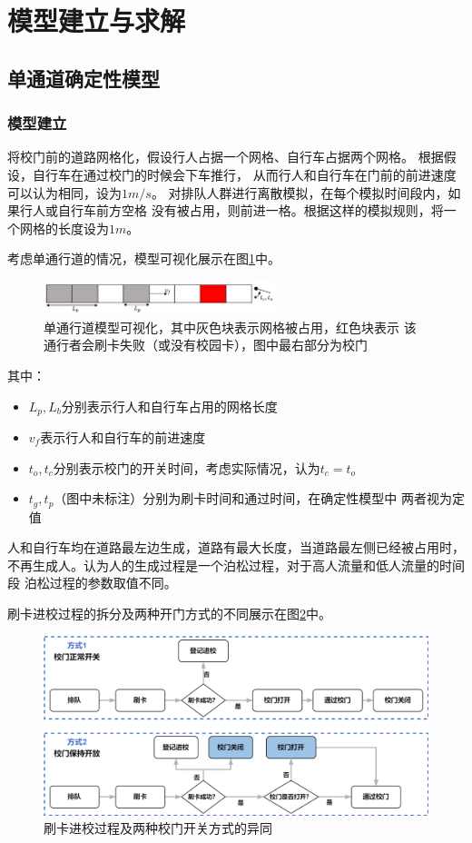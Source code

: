 \section{模型建立与求解}
\subsection{单通道确定性模型}
\subsubsection{模型建立}
\par 将校门前的道路网格化，假设行人占据一个网格、自行车占据两个网格。
根据假设，自行车在通过校门的时候会下车推行，
从而行人和自行车在门前的前进速度可以认为相同，设为$1m/s$。
对排队人群进行离散模拟，在每个模拟时间段内，如果行人或自行车前方空格
没有被占用，则前进一格。根据这样的模拟规则，将一个网格的长度设为$1m$。
\par 考虑单通行道的情况，模型可视化展示在图\ref{fig:1-lane-model}中。
\begin{figure}[ht]
    \centering
    \includegraphics[width=0.6\textwidth]{images/cellular_automata_1_lane.png}
    \caption{单通行道模型可视化，其中灰色块表示网格被占用，红色块表示
    该通行者会刷卡失败（或没有校园卡），图中最右部分为校门}
    \label{fig:1-lane-model}
\end{figure}
\newline 其中：
\begin{itemize}
    \item $L_p, L_b$分别表示行人和自行车占用的网格长度
    \item $v_f$表示行人和自行车的前进速度
    \item $t_o, t_c$分别表示校门的开关时间，考虑实际情况，认为$t_c=t_o$
    \item $t_g,t_p$（图中未标注）分别为刷卡时间和通过时间，在确定性模型中
    两者视为定值
\end{itemize}
人和自行车均在道路最左边生成，道路有最大长度，当道路最左侧已经被占用时，
不再生成人。认为人的生成过程是一个泊松过程，对于高人流量和低人流量的时间段
泊松过程的参数取值不同。
\par 刷卡进校过程的拆分及两种开门方式的不同展示在图\ref{fig:process-entering-gate}中。
\begin{figure}[ht]    
    \centering
    \includegraphics[width=.7\textwidth]{images/enter_gate_process.png}
    \caption{刷卡进校过程及两种校门开关方式的异同}
    \label{fig:process-entering-gate}
\end{figure}
